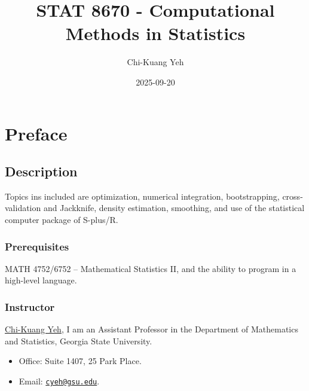 \documentclass[
  letterpaper,
  DIV=11,
  numbers=noendperiod]{scrreprt}
\title{STAT 8670 - Computational Methods in Statistics}
\author{Chi-Kuang Yeh}
\date{2025-09-20}
\providecommand{\tightlist}{%
  \setlength{\itemsep}{0pt}\setlength{\parskip}{0pt}}
\renewcommand*\contentsname{Table of contents}
\newcommand\contentsname{Table of contents}
\begin{document}
\maketitle

\renewcommand*\contentsname{Table of contents}
{
\hypersetup{linkcolor=}
\setcounter{tocdepth}{2}
\tableofcontents
}


\chapter*{Preface}\label{preface}


\section*{Description}\label{description}


Topics ins included are optimization, numerical integration,
bootstrapping, cross-validation and Jackknife, density estimation,
smoothing, and use of the statistical computer package of S-plus/R.

\subsection*{Prerequisites}\label{prerequisites}

MATH 4752/6752 -- Mathematical Statistics II, and the ability to program
in a high-level language.

\subsection*{Instructor}\label{instructor}

\href{https://chikuang.github.io/}{Chi-Kuang Yeh}, I am an Assistant
Professor in the Department of Mathematics and Statistics, Georgia State
University.

\begin{itemize}
\tightlist
\item
  Office: Suite 1407, 25 Park Place.
\item
  Email: \href{mailto:cyeh@gsu.edu}{\nolinkurl{cyeh@gsu.edu}}.
\end{itemize}
\end{document}
